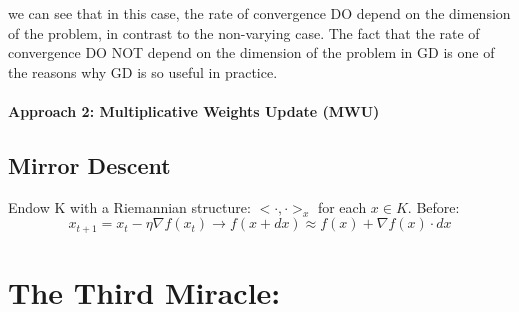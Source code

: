 \documentclass[11pt]{book} %
\begin{document}
we can see that in this case, the rate of convergence DO depend on the dimension of the problem, in contrast to the non-varying case.
The fact that the rate of convergence DO NOT depend on the dimension of the problem in GD is one of the reasons why GD is so useful in practice.


\subsubsection{Approach 2: Multiplicative Weights Update (MWU)}


\section{Mirror Descent}

Endow K with a Riemannian structure: $<\cdot, \cdot>_x$ for each $x \in K$. 
Before: 
\begin{equation}
    x_{t+1} = x_t - \eta \nabla f(x_t) \rightarrow f(x + dx) \approx f(x) + \nabla f(x) \cdot dx
\end{equation}


\chapter{The Third Miracle: }
\end{document}
